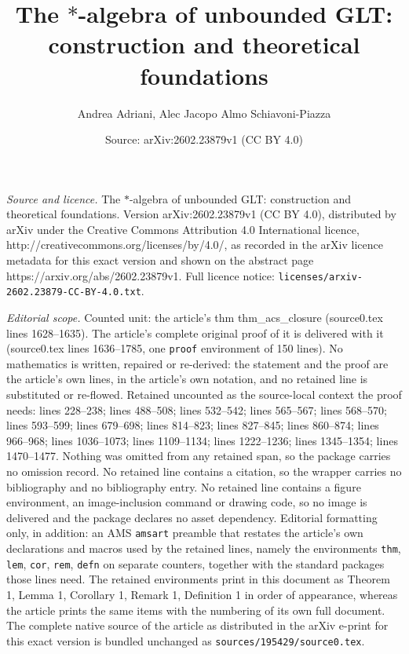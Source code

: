 \documentclass[10pt,a4paper]{amsart}
\title{The $*$-algebra of unbounded GLT: construction and theoretical foundations}
\author{Andrea Adriani, Alec Jacopo Almo Schiavoni-Piazza}
\date{Source: arXiv:2602.23879v1 (CC BY 4.0)}
\begin{document}
\maketitle

\noindent\emph{Source and licence.} The $*$-algebra of unbounded GLT: construction and theoretical foundations. Version arXiv:2602.23879v1 (CC BY 4.0), distributed by arXiv under the Creative Commons Attribution 4.0 International licence, http://creativecommons.org/licenses/by/4.0/, as recorded in the arXiv licence metadata for this exact version and shown on the abstract page https://arxiv.org/abs/2602.23879v1. Full licence notice: \texttt{licenses/arxiv-2602.23879-CC-BY-4.0.txt}.\par\smallskip

\noindent\textit{Editorial scope.} Counted unit: the article's thm thm\_acs\_closure (source0.tex lines 1628--1635). The article's complete original proof of it is delivered with it (source0.tex lines 1636--1785, one \texttt{proof} environment of 150 lines). No mathematics is written, repaired or re-derived: the statement and the proof are the article's own lines, in the article's own notation, and no retained line is substituted or re-flowed.  Retained uncounted as the source-local context the proof needs: lines 228--238; lines 488--508; lines 532--542; lines 565--567; lines 568--570; lines 593--599; lines 679--698; lines 814--823; lines 827--845; lines 860--874; lines 966--968; lines 1036--1073; lines 1109--1134; lines 1222--1236; lines 1345--1354; lines 1470--1477.  Nothing was omitted from any retained span, so the package carries no omission record.  No retained line contains a citation, so the wrapper carries no bibliography and no bibliography entry.  No retained line contains a figure environment, an image-inclusion command or drawing code, so no image is delivered and the package declares no asset dependency.  Editorial formatting only, in addition: an AMS \texttt{amsart} preamble that restates the article's own declarations and macros used by the retained lines, namely the environments \texttt{thm}, \texttt{lem}, \texttt{cor}, \texttt{rem}, \texttt{defn} on separate counters, together with the standard packages those lines need.  The retained environments print in this document as Theorem 1, Lemma 1, Corollary 1, Remark 1, Definition 1 in order of appearance, whereas the article prints the same items with the numbering of its own full document.  The complete native source of the article as distributed in the arXiv e-print for this exact version is bundled unchanged as \texttt{sources/195429/source0.tex}.
\end{document}
